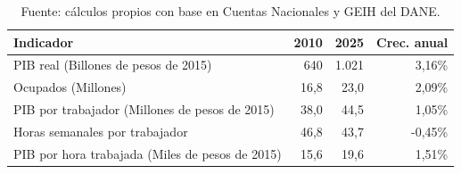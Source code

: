 \begin{table}[H]
\centering
\caption{PIB, ocupados, horas y productividad laboral, 2010--2025}
\label{tab:ocupados_horas_resumen}
\small
\begin{tabular}{lrrr}
\toprule
Indicador & 2010 & 2025 & Crec. anual \\
\midrule
PIB real (Billones de pesos de 2015) & 640 & 1.021 & 3,16\% \\
Ocupados (Millones) & 16,8 & 23,0 & 2,09\% \\
PIB por trabajador (Millones de pesos de 2015) & 38,0 & 44,5 & 1,05\% \\
Horas semanales por trabajador  & 46,8 & 43,7 & -0,45\% \\
PIB por hora trabajada (Miles de pesos de 2015) & 15,6 & 19,6 & 1,51\% \\
\bottomrule
\end{tabular}
\caption*{\footnotesize Fuente: cálculos propios con base en Cuentas Nacionales y GEIH del DANE.}
\end{table}

